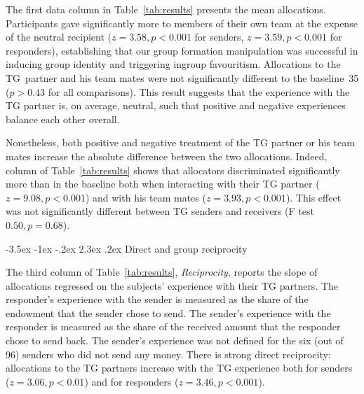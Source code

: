 \documentclass[12pt,a4paper]{article}\usepackage[]{graphicx}\usepackage[]{color}
\makeatletter
\renewcommand\subsection{\@startsection {subsection}{1}{\z@}%
{-3.5ex \@plus -1ex \@minus -.2ex}%
{2.3ex \@plus.2ex}%
{\it\large}}
\makeatother
\begin{document}
The first data column in Table~\ref{tab:results} presents the mean allocations.
Participants gave significantly more to members of their own team at the expense
of the neutral recipient ($z=3.58,p< 0.001$ for senders, 
$z=3.59,p< 0.001$ for
responders), establishing that our group formation manipulation was successful
in inducing group identity and triggering ingroup favouritism. Allocations to
the TG~partner and his team mates were not significantly different to the
baseline~35 ($p>0.43$ for all comparisons). This result suggests that the experience with the TG partner is, on average, neutral, such that positive and negative experiences balance each other overall.

Nonetheless, both positive and negative treatment of the TG partner or his team mates increase the absolute difference between the two allocations. Indeed,
column of Table~\ref{tab:results} shows that allocators discriminated significantly more
than in the baseline both when interacting with their TG partner
($z=9.08,p< 0.001$) and with his team mates 
($z=3.93,p< 0.001$). This effect was not
significantly different between TG senders and receivers (F test $0.50,
p= 0.68$).

\subsection{Direct and group reciprocity}
\label{sec:reciprocity}

The third column of Table~\ref{tab:results}, \emph{Reciprocity}, reports the slope of
allocations regressed on the subjects' experience with their TG partners. 
The responder's experience with the sender is measured
as the share of the endowment that the sender chose to send. The sender's experience with the responder is measured as the share
of the received amount that the responder chose to send back. 
The sender's experience was not defined
for the six (out of 96) senders who did not send any money.
%
There is strong direct reciprocity: allocations
to the TG partners increase with the TG experience both for
senders ($z=3.06,p< 0.01$) and for responders 
($z=3.46,p< 0.001$).
\end{document}
